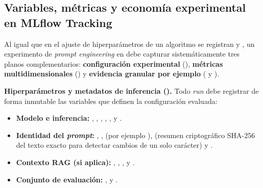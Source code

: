 \subsection{Variables, métricas y economía experimental en MLflow Tracking}\label{subsec:variables-metricas-tracking}

Al igual que en el ajuste de hiperparámetros de un algoritmo  se registran  y , un experimento de \textit{prompt engineering} en  debe capturar sistemáticamente tres planos complementarios: \textbf{configuración experimental} (), \textbf{métricas multidimensionales} () y \textbf{evidencia granular por ejemplo} ( y ).

\textbf{Hiperparámetros y metadatos de inferencia ().} Todo \textit{run} debe registrar de forma inmutable las variables que definen la configuración evaluada:
\begin{itemize}
  \item \textbf{Modelo e inferencia:} , , , , ,  y .
  \item \textbf{Identidad del \textit{prompt}:} , ,  (por ejemplo ),  (resumen criptográfico SHA-256 del texto exacto para detectar cambios de un solo carácter) y .
  \item \textbf{Contexto RAG (si aplica):} , , ,  y .
  \item \textbf{Conjunto de evaluación:} ,  y .
\end{itemize}

